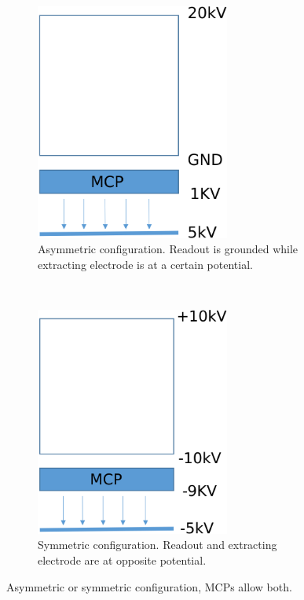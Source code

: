 \begin{figure}[!ht]
  \begin{subfigure}[t]{0.5\textwidth}
    \centering
    \includegraphics[width=0.7\textwidth]{04_IPHI_Test/figures/fig000_setup_hv_asym}
    \caption{Asymmetric configuration.
    Readout is grounded while extracting electrode is at a certain potential.}
    \label{chap4:setup_hv_asym}
  \end{subfigure}
  ~
  \begin{subfigure}[t]{0.5\textwidth}
    \centering
    \includegraphics[width=0.7\textwidth]{04_IPHI_Test/figures/fig000_setup_hv_sym}
    \caption{Symmetric configuration. Readout and extracting electrode are at opposite potential.}
    \label{chap4:setup_hv_sym}
  \end{subfigure}
  \caption[Asymmetric or symmetric configuration]{Asymmetric or symmetric configuration, MCPs allow both.}
  \label{chap4:setup_hv}
\end{figure}

